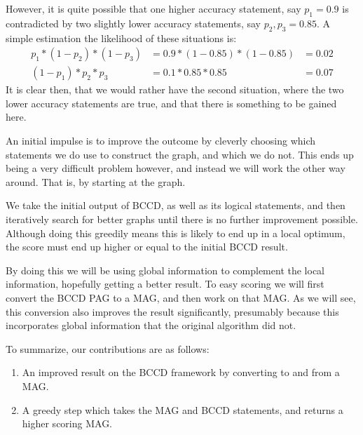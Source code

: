 \documentclass[11pt,a4paper]{report}
\begin{document}
However, it is quite possible that one higher accuracy statement, say
$p_1 = 0.9$ is contradicted by two slightly lower accuracy statements,
say $p_2, p_3 = 0.85$. A simple estimation the likelihood of these
situations is:
\begin{align*}
  p_1 * (1 - p_2) * (1 - p_3) &= 0.9 * (1 - 0.85) * (1 - 0.85) &= 0.02 \\
  (1 - p_1) * p_2 * p_3 &= 0.1 * 0.85 * 0.85 &= 0.07
\end{align*}
It is clear then, that we would rather have the second situation, where
the two lower accuracy statements are true, and that there is something to
be gained here.

An initial impulse is to improve the outcome by cleverly choosing which
statements we do use to construct the graph, and which we do not. This
ends up being a very difficult problem however, and instead we will work
the other way around. That is, by starting at the graph.

We take the initial output of BCCD, as well as its logical statements, and
then iteratively search for better graphs until there is no further
improvement possible. Although doing this greedily means this is likely to
end up in a local optimum, the score must end up higher or equal to the
initial BCCD result.

By doing this we will be using global information to complement the local
information, hopefully getting a better result. To easy scoring we will
first convert the BCCD PAG to a MAG, and then work on that MAG. As we will
see, this conversion also improves the result significantly, presumably
because this incorporates global information that the original algorithm
did not.

To summarize, our contributions are as follows:
\begin{enumerate}
  \item An improved result on the BCCD framework by converting to and from
    a MAG.

  \item A greedy step which takes the MAG and BCCD statements, and returns
    a higher scoring MAG.
\end{enumerate}

\end{document}
